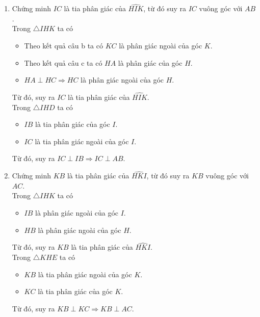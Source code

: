 \begin{bt}
{\begin{enumerate}
\begin{itemize}
				\item Theo kết quả câu b suy ra $KA$ là phân giác ngoài của góc $K$.
			\end{itemize}
			Từ đó, suy ra $HA$ là tia phân giác của $\widehat{IHK}$.
			\item Chứng minh $IC$ là tia phân giác của $\widehat{HIK}$, từ đó suy ra $IC$ vuông góc với $AB$.\\
			Trong $\triangle IHK$ ta có
			\begin{itemize}
				\item Theo kết quả câu b ta có $KC$ là phân giác ngoài của góc $K$.
				\item Theo kết quả câu c ta có $HA$ là phân giác của góc $H$.
				\item $HA\perp HC\Rightarrow HC$ là phân giác ngoài của góc $H$.
			\end{itemize}
			Từ đó, suy ra $IC$ là tia phân giác của $\widehat{HIK}$.\\
			Trong $\triangle IHD$ ta có
			\begin{itemize}
				\item $IB$ là tia phân giác của góc $I$.
				\item $IC$ là tia phân giác ngoài của góc $I$.
			\end{itemize}
			Từ đó, suy ra $IC\perp IB\Rightarrow IC\perp AB$.
			\item Chứng minh $KB$ là tia phân giác của $\widehat{HKI}$, từ đó suy ra $KB$ vuông góc với $AC$.\\
			Trong $\triangle IHK$ ta có
			\begin{itemize}
				\item $IB$ là phân giác ngoài của góc $I$.
				\item $HB$ là phân giác ngoài của góc $H$.
			\end{itemize}
			Từ đó, suy ra $KB$ là tia phân giác của $\widehat{HKI}$.\\
			Trong $\triangle KHE$ ta có
			\begin{itemize}
				\item $KB$ là tia phân giác ngoài của góc $K$.
				\item $KC$ là tia phân giác của góc $K$.
			\end{itemize}
			Từ đó, suy ra $KB\perp KC\Rightarrow KB\perp AC$.
		\end{enumerate}
	}
\end{bt}